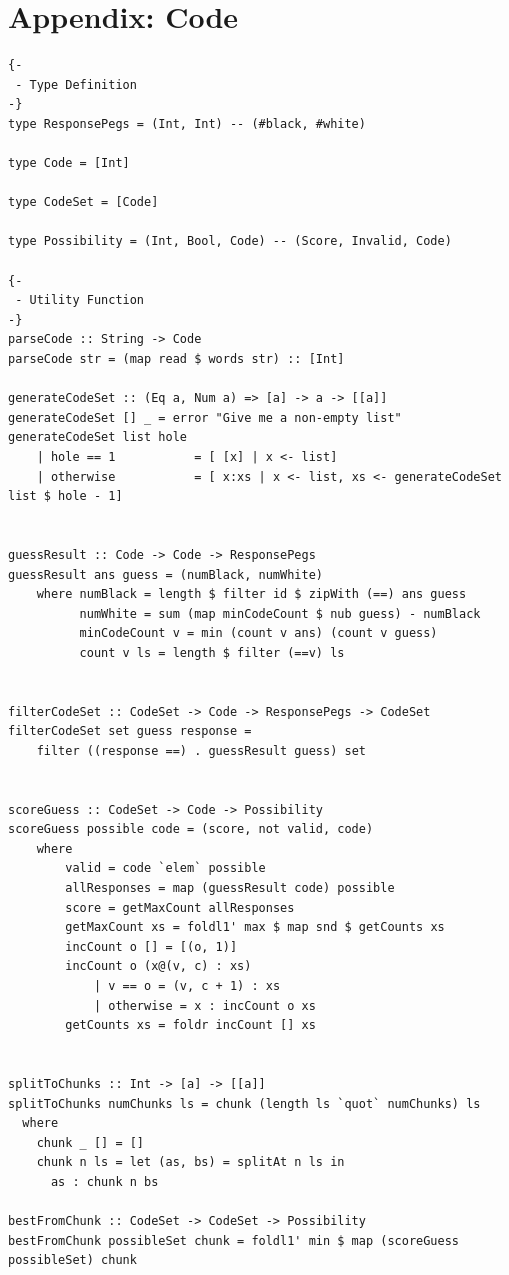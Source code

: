 \documentclass{article}
\begin{document}
\section{Appendix: Code}
\label{sec:code}
\begin{verbatim}
{-
 - Type Definition
-}
type ResponsePegs = (Int, Int) -- (#black, #white)

type Code = [Int]

type CodeSet = [Code]

type Possibility = (Int, Bool, Code) -- (Score, Invalid, Code)

{-
 - Utility Function
-}
parseCode :: String -> Code
parseCode str = (map read $ words str) :: [Int]

generateCodeSet :: (Eq a, Num a) => [a] -> a -> [[a]]
generateCodeSet [] _ = error "Give me a non-empty list"
generateCodeSet list hole
    | hole == 1           = [ [x] | x <- list]
    | otherwise           = [ x:xs | x <- list, xs <- generateCodeSet list $ hole - 1]
    
    
guessResult :: Code -> Code -> ResponsePegs
guessResult ans guess = (numBlack, numWhite)
    where numBlack = length $ filter id $ zipWith (==) ans guess
          numWhite = sum (map minCodeCount $ nub guess) - numBlack
          minCodeCount v = min (count v ans) (count v guess)
          count v ls = length $ filter (==v) ls


filterCodeSet :: CodeSet -> Code -> ResponsePegs -> CodeSet
filterCodeSet set guess response =
    filter ((response ==) . guessResult guess) set


scoreGuess :: CodeSet -> Code -> Possibility
scoreGuess possible code = (score, not valid, code)
    where
        valid = code `elem` possible
        allResponses = map (guessResult code) possible
        score = getMaxCount allResponses
        getMaxCount xs = foldl1' max $ map snd $ getCounts xs
        incCount o [] = [(o, 1)]
        incCount o (x@(v, c) : xs)
            | v == o = (v, c + 1) : xs
            | otherwise = x : incCount o xs
        getCounts xs = foldr incCount [] xs
       
      
splitToChunks :: Int -> [a] -> [[a]]
splitToChunks numChunks ls = chunk (length ls `quot` numChunks) ls
  where
    chunk _ [] = []
    chunk n ls = let (as, bs) = splitAt n ls in
      as : chunk n bs

bestFromChunk :: CodeSet -> CodeSet -> Possibility
bestFromChunk possibleSet chunk = foldl1' min $ map (scoreGuess possibleSet) chunk


\end{verbatim}
\end{document}
